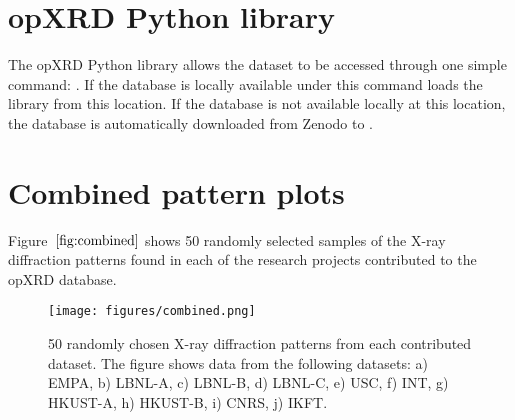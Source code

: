 \documentclass[a4paper]{article}
\begin{document}
\section{opXRD Python library }

 The opXRD Python library allows the dataset to be accessed through one simple command: . If the database is locally available under  this command loads the library from this location. If the database is not available locally at this location, the database is automatically downloaded from Zenodo to . 


\pagebreak

\section{Combined pattern plots}
Figure~$\eqref{fig:combined}$ shows 50 randomly selected samples of the X-ray diffraction patterns found in each of the research projects contributed to the opXRD database.

\begin{figure}[!htb]
    \centering
    \texttt{[image: figures/combined.png]}
    \caption{50 randomly chosen X-ray diffraction patterns from each contributed dataset. The figure shows data from the following datasets: a) EMPA, b) LBNL-A, c) LBNL-B, d) LBNL-C, e) USC, f) INT, g) HKUST-A, h) HKUST-B, i) CNRS, j) IKFT.}
    \label{fig:combined}
\end{figure}
\end{document}
